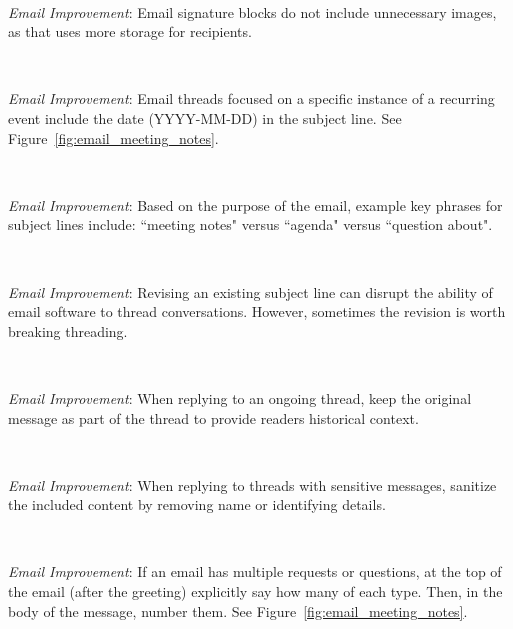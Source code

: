 \ \\
\begin{samepage}
\textit{Email Improvement}: Email signature blocks do not include unnecessary images, as that uses more storage for recipients.
\end{samepage}

\ \\
\begin{samepage}
\textit{Email Improvement}: Email threads focused on a specific instance of a recurring event include the date (YYYY-MM-DD) in the subject line. See Figure~\ref{fig:email_meeting_notes}.
\end{samepage}

\ \\
\begin{samepage}
\textit{Email Improvement}: Based on the purpose of the email, example key phrases for subject lines include: ``meeting notes" versus ``agenda" versus ``question about".
\end{samepage}

\ \\
\begin{samepage}
\textit{Email Improvement}: Revising an existing subject line can disrupt the ability of email software to thread conversations. However, sometimes the revision is worth breaking threading.
\end{samepage}

\ \\
\begin{samepage}
\textit{Email Improvement}: When replying to an ongoing thread, keep the original message as part of the thread to provide readers historical context.
\end{samepage}

\ \\
\begin{samepage}
\textit{Email Improvement}: When replying to threads with sensitive messages, sanitize the included content by removing name or identifying details.
\end{samepage}

\ \\
\begin{samepage}
\textit{Email Improvement}: If an email has multiple requests or questions, at the top of the email (after the greeting) explicitly say how many of each type. Then, in the body of the message, number them. See Figure~\ref{fig:email_meeting_notes}.
\end{samepage}

